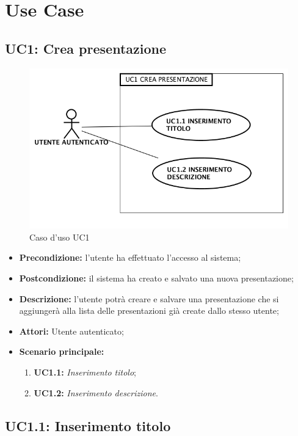 
\section{Use Case}
\subsection{ UC1: Crea presentazione}

\begin{figure}[h]
	\begin{center}
	\includegraphics[scale=0.4]{diagram/UC1.png}
	\caption{Caso d'uso UC1}
	\end{center}
\end{figure}
\begin{itemize}
	\item \textbf{Precondizione:} l'utente ha effettuato l'accesso al sistema;
	\item \textbf{Postcondizione:} il sistema ha creato e salvato una nuova presentazione;
	\item \textbf{Descrizione:} l'utente potrà creare e salvare una presentazione che si aggiungerà alla lista delle presentazioni già create dallo stesso utente;
	\item \textbf{Attori:} Utente autenticato;
	\item \textbf{Scenario principale:}
	\begin{enumerate}
		\item \textbf{ UC1.1:} \textit{ Inserimento titolo};
		\item \textbf{ UC1.2:} \textit{ Inserimento descrizione}.
	\end{enumerate}
\end{itemize}
\subsection{ UC1.1: Inserimento titolo}

